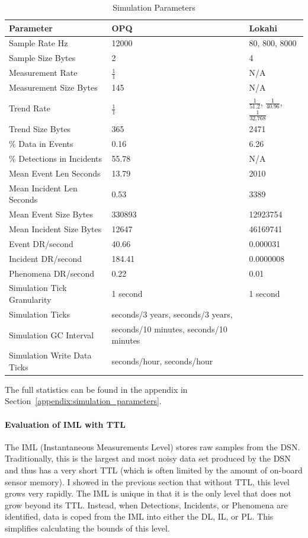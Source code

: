 \begin{table}[H]
	\centering
	\caption{Simulation Parameters}
	\begin{tabularx}{\textwidth}{Xll}
		\toprule
		\textbf{Parameter} & \textbf{OPQ} & \textbf{Lokahi} \\
		\midrule
		Sample Rate Hz & 12000 & 80, 800, 8000 \\
		Sample Size Bytes & 2 & 4 \\
		Measurement Rate & $\frac{1}{1}$ & N/A \\
		Measurement Size Bytes & 145 & N/A \\
		Trend Rate & $\frac{1}{1}$ & $\frac{1}{51.2}$, $\frac{1}{40.96}$, $\frac{1}{32.768}$ \\
		Trend Size Bytes & 365 & 2471 \\
		\% Data in Events & 0.16 & 6.26 \\
		\% Detections in Incidents & 55.78 & N/A \\
		Mean Event Len Seconds & 13.79 & 2010 \\
		Mean Incident Len Seconds & 0.53 & 3389 \\
		Mean Event Size Bytes & 330893 & 12923754 \\
		Mean Incident Size Bytes & 12647 & 46169741 \\
		Event DR/second & 40.66 &  0.000031 \\
		Incident DR/second & 184.41 &  0.0000008 \\
		Phenomena DR/second & 0.22 & 0.01 \\
		Simulation Tick Granularity & 1 second & 1 second \\
		Simulation Ticks & seconds/3 years, seconds/3 years, \\
		Simulation GC Interval & seconds/10 minutes, seconds/10 minutes \\
		Simulation Write Data Ticks & seconds/hour, seconds/hour \\
		\bottomrule
	\end{tabularx}
	\label{table:sim_params}
\end{table}

The full statistics can be found in the appendix in Section~\ref{appendix:simulation_parameters}.

\paragraph{Evaluation of IML with TTL}
The IML (Instantaneous Measurements Level) stores raw samples from the DSN. Traditionally, this is the largest and most noisy data set produced by the DSN and thus has a very short TTL (which is often limited by the amount of on-board sensor memory). I showed in the previous section that without TTL, this level grows very rapidly. The IML is unique in that it is the only level that does not grow beyond its TTL. Instead, when Detections, Incidents, or Phenomena are identified, data is coped from the IML into either the DL, IL, or PL. This simplifies calculating the bounds of this level.

